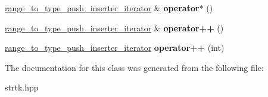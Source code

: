 \begin{DoxyCompactItemize}
\item 
\hypertarget{classstrtk_1_1range__to__type__push__inserter__iterator_a3f98f5df13dd951b57622fe609a0ce86}{\hyperlink{classstrtk_1_1range__to__type__push__inserter__iterator}{range\-\_\-to\-\_\-type\-\_\-push\-\_\-inserter\-\_\-iterator} \& {\bfseries operator$\ast$} ()}\label{classstrtk_1_1range__to__type__push__inserter__iterator_a3f98f5df13dd951b57622fe609a0ce86}

\item 
\hypertarget{classstrtk_1_1range__to__type__push__inserter__iterator_a90e9c11ace0790477e902d5b122ce63f}{\hyperlink{classstrtk_1_1range__to__type__push__inserter__iterator}{range\-\_\-to\-\_\-type\-\_\-push\-\_\-inserter\-\_\-iterator} \& {\bfseries operator++} ()}\label{classstrtk_1_1range__to__type__push__inserter__iterator_a90e9c11ace0790477e902d5b122ce63f}

\item 
\hypertarget{classstrtk_1_1range__to__type__push__inserter__iterator_ad96fda85234f520bf1a31da60e63e0c3}{\hyperlink{classstrtk_1_1range__to__type__push__inserter__iterator}{range\-\_\-to\-\_\-type\-\_\-push\-\_\-inserter\-\_\-iterator} {\bfseries operator++} (int)}\label{classstrtk_1_1range__to__type__push__inserter__iterator_ad96fda85234f520bf1a31da60e63e0c3}

\end{DoxyCompactItemize}


The documentation for this class was generated from the following file\-:\begin{DoxyCompactItemize}
\item 
strtk.\-hpp\end{DoxyCompactItemize}
